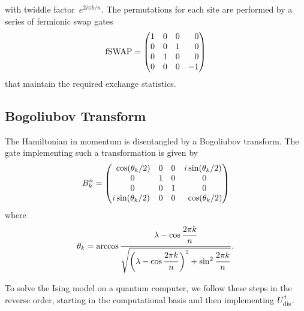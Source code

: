 \documentclass[12pt, twocolumn]{article}
\newcommand*{\eu}{e}
\newcommand*{\iu}{i}
\begin{document}
  with twiddle factor~\( \eu^{2 \iu \pi k / n} \). The permutations for each site are performed by a series of fermionic swap gates
  \begin{equation}
    \mathrm{fSWAP}
      = \begin{pmatrix}
          1 & 0 & 0 & \hphantom{-}0 \\
          0 & 0 & 1 & \hphantom{-}0 \\
          0 & 1 & 0 & \hphantom{-}0 \\
          0 & 0 & 0 &           - 1
        \end{pmatrix}
  \end{equation}
  that maintain the required exchange statistics.

  \subsection{Bogoliubov Transform}
  The Hamiltonian in momentum is disentangled by a Bogoliubov transform. The gate implementing such a transformation is given by
  \begin{equation}
    B_{k}^{n}
      = \begin{pmatrix}
          \hphantom{\iu} \cos(\theta_{k} / 2)
                           & 0 & 0 &           \iu  \sin(\theta_{k} / 2) \\
          \hphantom{\iu} 0 & 1 & 0 & \hphantom{\iu} 0 \\
          \hphantom{\iu} 0 & 0 & 1 & \hphantom{\iu} 0 \\
                    \iu  \sin(\theta_{k} / 2)
                           & 0 & 0 & \hphantom{\iu} \cos(\theta_{k} / 2)
      \end{pmatrix}
  \end{equation}
  where
  \begin{equation}
    \theta_{k}
      = \arccos
        \frac{\lambda - \cos \qfrac{2 \pi k}{n}}
             {\sqrt{\biggl( \lambda - \cos \qfrac*{2 \pi k}{n} \biggr)^{2}
              + \sin^{2} \qfrac*{2 \pi k}{n}}}.
  \end{equation}

  To solve the Ising model on a quantum computer, we follow these steps in the reverse order, starting in the computational basis and then implementing \( U_{\textnormal{dis}}^{\dagger} \).
\end{document}
